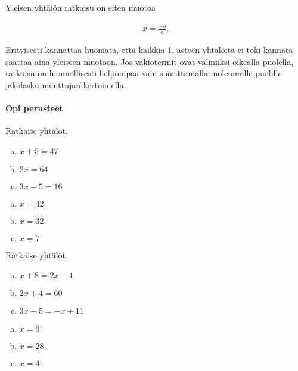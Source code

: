 Yleisen yhtälön ratkaisu on siten muotoa

\begin{align*}
  x = \frac{-b}{a}.
\end{align*}

Erityisesti kannattaa huomata, että kaikkia 1. asteen yhtälöitä ei toki
kannata saattaa aina yleiseen muotoon. Jos vakiotermit ovat valmiiksi oikealla
puolella, ratkaisu on luonnollisesti helpompaa vain suorittamalla
molemmille puolille jakolasku muuttujan kertoimella.

\Harjoitustehtavat

\paragraph*{Opi perusteet}

\begin{tehtava}
    Ratkaise yhtälöt.
    \begin{enumerate}[(a)]
        \item $x + 5 = 47$
        \item $2x = 64$
        \item $3x - 5 = 16$
    \end{enumerate}
    \begin{vastaus}
        \begin{enumerate}[(a)]
            \item $x = 42$
            \item $x = 32$
            \item $x = 7$
        \end{enumerate}
    \end{vastaus}
\end{tehtava}

\begin{tehtava}
    Ratkaise yhtälöt.
    \begin{enumerate}[(a)]
        \item $x + 8 = 2x - 1$
        \item $2x + 4 = 60$
        \item $3x - 5 = -x + 11$
    \end{enumerate}
    \begin{vastaus}
        \begin{enumerate}[(a)]
            \item $x = 9$
            \item $x = 28$
            \item $x = 4$
        \end{enumerate}
    \end{vastaus}
\end{tehtava}

